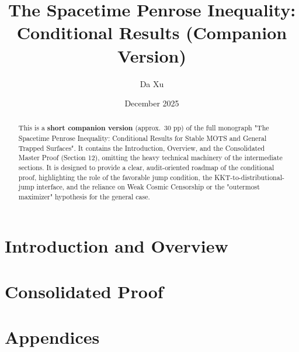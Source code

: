 \documentclass[11pt]{amsart}
\title[Spacetime Penrose Inequality (Companion)]{The Spacetime Penrose Inequality: Conditional Results (Companion Version)}
\author{Da Xu}
\date{December 2025}
\theoremstyle{plain}
\theoremstyle{definition}
\theoremstyle{remark}
\theoremstyle{plain}
\numberwithin{equation}{section}
\begin{document}
\begin{abstract}
This is a \textbf{short companion version} (approx.\ 30 pp) of the full monograph "The Spacetime Penrose Inequality: Conditional Results for Stable MOTS and General Trapped Surfaces". It contains the Introduction, Overview, and the Consolidated Master Proof (Section 12), omitting the heavy technical machinery of the intermediate sections. It is designed to provide a clear, audit-oriented roadmap of the conditional proof, highlighting the role of the favorable jump condition, the KKT-to-distributional-jump interface, and the reliance on Weak Cosmic Censorship or the "outermost maximizer" hypothesis for the general case.
\end{abstract}

\maketitle

\setcounter{tocdepth}{1}
\tableofcontents

\part{Introduction and Overview}




\part{Consolidated Proof}


\part{Appendices}
\appendix





\end{document}
